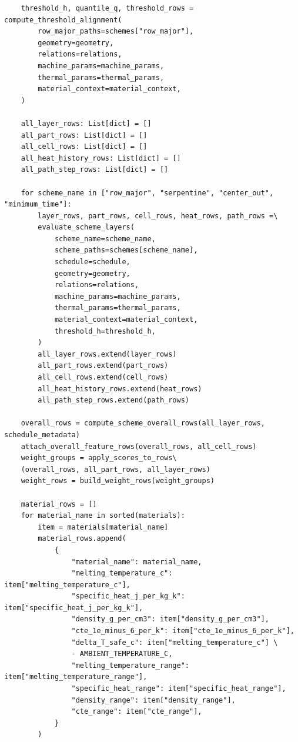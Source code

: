 \documentclass[a4paper, 12pt]{ctexart}
\begin{document}
\begin{verbatim}
    threshold_h, quantile_q, threshold_rows = compute_threshold_alignment(
        row_major_paths=schemes["row_major"],
        geometry=geometry,
        relations=relations,
        machine_params=machine_params,
        thermal_params=thermal_params,
        material_context=material_context,
    )

    all_layer_rows: List[dict] = []
    all_part_rows: List[dict] = []
    all_cell_rows: List[dict] = []
    all_heat_history_rows: List[dict] = []
    all_path_step_rows: List[dict] = []

    for scheme_name in ["row_major", "serpentine", "center_out", "minimum_time"]:
        layer_rows, part_rows, cell_rows, heat_rows, path_rows =\
        evaluate_scheme_layers(
            scheme_name=scheme_name,
            scheme_paths=schemes[scheme_name],
            schedule=schedule,
            geometry=geometry,
            relations=relations,
            machine_params=machine_params,
            thermal_params=thermal_params,
            material_context=material_context,
            threshold_h=threshold_h,
        )
        all_layer_rows.extend(layer_rows)
        all_part_rows.extend(part_rows)
        all_cell_rows.extend(cell_rows)
        all_heat_history_rows.extend(heat_rows)
        all_path_step_rows.extend(path_rows)

    overall_rows = compute_scheme_overall_rows(all_layer_rows, schedule_metadata)
    attach_overall_feature_rows(overall_rows, all_cell_rows)
    weight_groups = apply_scores_to_rows\
    (overall_rows, all_part_rows, all_layer_rows)
    weight_rows = build_weight_rows(weight_groups)

    material_rows = []
    for material_name in sorted(materials):
        item = materials[material_name]
        material_rows.append(
            {
                "material_name": material_name,
                "melting_temperature_c": item["melting_temperature_c"],
                "specific_heat_j_per_kg_k": item["specific_heat_j_per_kg_k"],
                "density_g_per_cm3": item["density_g_per_cm3"],
                "cte_1e_minus_6_per_k": item["cte_1e_minus_6_per_k"],
                "delta_T_safe_c": item["melting_temperature_c"] \
                - AMBIENT_TEMPERATURE_C,
                "melting_temperature_range": item["melting_temperature_range"],
                "specific_heat_range": item["specific_heat_range"],
                "density_range": item["density_range"],
                "cte_range": item["cte_range"],
            }
        )


\end{verbatim}
\end{document}

